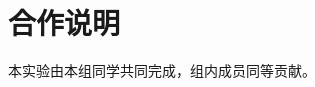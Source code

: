 \documentclass[11pt]{article}
\begin{document}










\section{合作说明}

本实验由本组同学共同完成，组内成员同等贡献。
\end{document}
